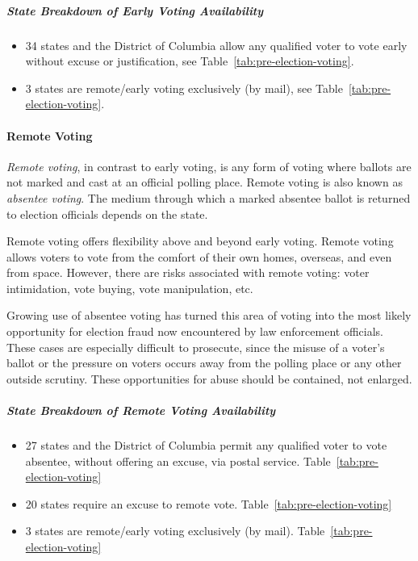 \subparagraph{State Breakdown of Early Voting Availability}

\begin{itemize}
  \item 34 states and the District of Columbia allow any qualified voter to vote
    early without excuse or justification, see
    Table~\ref{tab:pre-election-voting}.

  \item 3 states are remote/early voting exclusively (by mail), see
    Table~\ref{tab:pre-election-voting}.
\end{itemize}

\paragraph{Remote Voting}
\emph{Remote voting}, in contrast to early voting, is any form of voting where
ballots are not marked and cast at an official polling place. Remote voting is
also known as \emph{absentee voting}. The medium through which a marked absentee
ballot is returned to election officials depends on the state.

Remote voting offers flexibility above and beyond early voting. Remote voting
allows voters to vote from the comfort of their own homes, overseas, and even
from space. However, there are risks associated with remote voting:
voter intimidation, vote buying, vote manipulation, etc.

\begin{displayquote}
   Growing use of absentee voting has turned this area of voting into the most
   likely opportunity for election fraud now encountered by law enforcement
   officials. These cases are especially difficult to prosecute, since the
   misuse of a voter’s ballot or the pressure on voters occurs away from the
   polling place or any other outside scrutiny. These opportunities for abuse
   should be contained, not enlarged.
\end{displayquote}

\subparagraph{State Breakdown of Remote Voting Availability}

\begin{itemize}
  \item 27 states and the District of Columbia permit any qualified voter to
    vote absentee, without offering an excuse, via postal service.
    Table~\ref{tab:pre-election-voting}

  \item 20 states require an excuse to remote vote.
    Table~\ref{tab:pre-election-voting}

  \item 3 states are remote/early voting exclusively (by mail).
    Table~\ref{tab:pre-election-voting}
\end{itemize}

